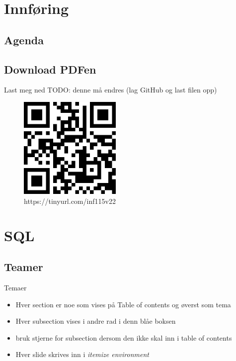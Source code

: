 
\begin{frame}[t,plain]
    \titlepage
\end{frame}

\section{Innføring}
\subsection*{Agenda}
\begin{frame}
    \tableofcontents
\end{frame}

\subsection*{Download PDFen}
\begin{frame}{Last meg ned}
TODO: denne må endres (lag GitHub og last filen opp)
    \begin{figure}
        \centering
        \includegraphics[height = 4.9cm]{images/downloadqr.png}
        \caption{https://tinyurl.com/inf115v22}
        \label{fig:qrcode}
    \end{figure}
\end{frame}

\section{SQL}
\subsection*{Teamer}
\begin{frame}{Temaer}
\begin{itemize}
    \item Hver section er noe som vises på Table of contents og øverst som tema
    \item Hver subsection vises i andre rad i denn blåe boksen
    \item bruk stjerne for subsection dersom den ikke skal inn i table of contents
    \item Hver slide skrives inn i \textit{itemize environment}
\end{itemize}
\end{frame}

